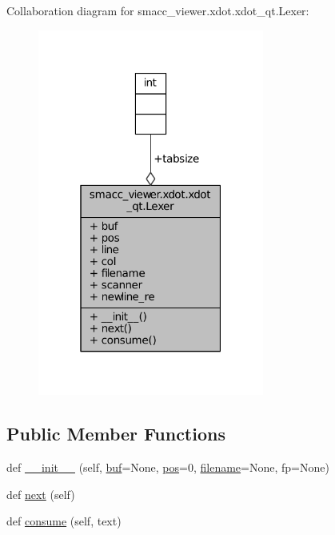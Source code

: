 Collaboration diagram for smacc\+\_\+viewer.\+xdot.\+xdot\+\_\+qt.\+Lexer\+:
\nopagebreak
\begin{figure}[H]
\begin{center}
\leavevmode
\includegraphics[width=211pt]{classsmacc__viewer_1_1xdot_1_1xdot__qt_1_1Lexer__coll__graph}
\end{center}
\end{figure}
\subsection*{Public Member Functions}
\begin{DoxyCompactItemize}
\item 
def \hyperlink{classsmacc__viewer_1_1xdot_1_1xdot__qt_1_1Lexer_aa8397f2a53b2c598d0442515b2c2ea95}{\+\_\+\+\_\+init\+\_\+\+\_\+} (self, \hyperlink{classsmacc__viewer_1_1xdot_1_1xdot__qt_1_1Lexer_a84972711cf93f6cb82650f9f268198bf}{buf}=None, \hyperlink{classsmacc__viewer_1_1xdot_1_1xdot__qt_1_1Lexer_a091be9759b62e2a485ea9538b429b453}{pos}=0, \hyperlink{classsmacc__viewer_1_1xdot_1_1xdot__qt_1_1Lexer_a568d66f9f2bcbf00150f2ad4889295da}{filename}=None, fp=None)
\item 
def \hyperlink{classsmacc__viewer_1_1xdot_1_1xdot__qt_1_1Lexer_aa2b5bcafeb77f508d679e7c81e3b58ca}{next} (self)
\item 
def \hyperlink{classsmacc__viewer_1_1xdot_1_1xdot__qt_1_1Lexer_a8cf96c4dfb5bc99dce408ffe5669ec4b}{consume} (self, text)
\end{DoxyCompactItemize}
